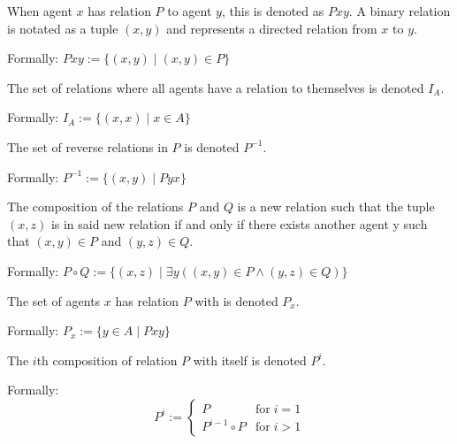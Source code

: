 \begin{definition}
    
\begin{subdefinition}
    When agent \(x\) has relation \(P\) to agent \(y\), this is denoted as \(Pxy\). 
    A binary relation is notated as a tuple \((x,y)\) and represents a directed relation from \(x\) to \(y\). 
    
    Formally: \(Pxy := \{ (x, y) \mid (x,y) \in P \}\)
    \label{def:rel-bin}
\end{subdefinition}

\begin{subdefinition}
    The set of relations where all agents have a relation to themselves is denoted \(I_A\).
    
    Formally: \(I_A := \{(x,x) \mid x \in A\}\)
    \label{def:rel-id}
\end{subdefinition}

\begin{subdefinition}
    The set of reverse relations in \(P\) is denoted \(P^{-1}\).

    Formally: \(P^{-1} := \{(x,y) \mid Pyx\}\)
    \label{def:rel-conv}
\end{subdefinition}

\begin{subdefinition}
    The composition of the relations \(P\) and \(Q\) is a new relation such that the tuple \((x,z)\) is in said new relation if and only if there exists another agent y such that \((x,y) \in P\) and \((y,z) \in Q\).

    Formally: \(P \circ Q := \{(x,z) \mid \exists y ((x, y) \in P \land (y, z) \in Q) \}\)
    \label{def:rel-comp}
\end{subdefinition}

\begin{subdefinition}
    The set of agents \(x\) has relation \(P\) with is denoted \(P_x\).

    Formally: \(P_x := \{ y \in A \mid Pxy \}\)
    \label{def:rel-acq} %
\end{subdefinition}

\begin{subdefinition}
    The \(i\)th composition of relation \(P\) with itself is denoted \(P^i\).

    Formally: 
    \[
        P^i := 
        \begin{cases}
            P               & \text{for} \; i = 1\\
            P^{i-1} \circ P & \text{for} \; i > 1
        \end{cases}
    \]
    \label{def:rel-icomp}
\end{subdefinition}


\end{definition}
